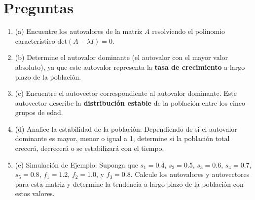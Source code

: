 \documentclass{article}
\begin{document}
\section*{Preguntas}

\begin{enumerate}
    \item (a) Encuentre los autovalores de la matriz \( A \) resolviendo el polinomio característico \(\text{det}(A - \lambda I) = 0\).

    \item (b) Determine el autovalor dominante (el autovalor con el mayor valor absoluto), ya que este autovalor representa la \textbf{tasa de crecimiento} a largo plazo de la población.

    \item (c) Encuentre el autovector correspondiente al autovalor dominante. Este autovector describe la \textbf{distribución estable} de la población entre los cinco grupos de edad.

    \item (d) Analice la estabilidad de la población: Dependiendo de si el autovalor dominante es mayor, menor o igual a 1, determine si la población total crecerá, decrecerá o se estabilizará con el tiempo.

    \item (e) Simulación de Ejemplo: Suponga que \( s_1 = 0.4 \), \( s_2 = 0.5 \), \( s_3 = 0.6 \), \( s_4 = 0.7 \), \( s_5 = 0.8 \), \( f_1 = 1.2 \), \( f_2 = 1.0 \), y \( f_3 = 0.8 \). Calcule los autovalores y autovectores para esta matriz y determine la tendencia a largo plazo de la población con estos valores.
\end{enumerate}
\end{document}
